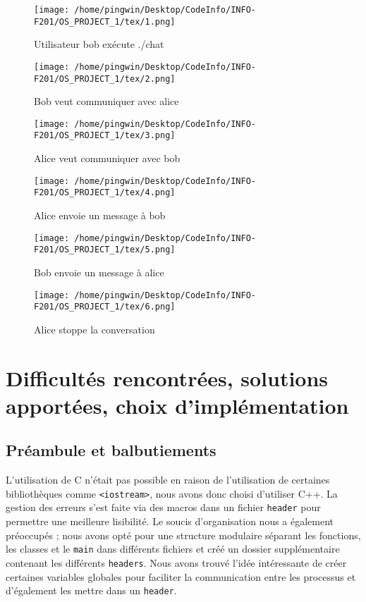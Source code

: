 \documentclass{article}
\begin{document}
\begin{figure}[H]
    \centering
    \texttt{[image: /home/pingwin/Desktop/CodeInfo/INFO-F201/OS\_PROJECT\_1/tex/1.png]}
    \caption{Utilisateur bob exécute ./chat}
    \label{fig:1}
\end{figure}
\begin{figure}[H]
    \centering
    \texttt{[image: /home/pingwin/Desktop/CodeInfo/INFO-F201/OS\_PROJECT\_1/tex/2.png]}
    \caption{Bob veut communiquer avec alice}
    \label{fig:2}
\end{figure}
\begin{figure}[H]
    \centering
    \texttt{[image: /home/pingwin/Desktop/CodeInfo/INFO-F201/OS\_PROJECT\_1/tex/3.png]}
    \caption{Alice veut communiquer avec bob}
    \label{fig:3}
\end{figure}
\begin{figure}[H]
    \centering
    \texttt{[image: /home/pingwin/Desktop/CodeInfo/INFO-F201/OS\_PROJECT\_1/tex/4.png]}
    \caption{Alice envoie un message à bob}
    \label{fig:4}
\end{figure}
\begin{figure}[H]
    \centering
    \texttt{[image: /home/pingwin/Desktop/CodeInfo/INFO-F201/OS\_PROJECT\_1/tex/5.png]}
    \caption{Bob envoie un message à alice}
    \label{fig:5}
\end{figure}
\begin{figure}[H]
    \centering
    \texttt{[image: /home/pingwin/Desktop/CodeInfo/INFO-F201/OS\_PROJECT\_1/tex/6.png]}
    \caption{Alice stoppe la conversation}
    \label{fig:6}
\end{figure}




\section{Difficultés rencontrées, solutions apportées, choix d'implémentation}
\label{difficultes-rencontrees-solutions-apportees-choix-dimplementation}

\subsection{Préambule et balbutiements}
\label{preambule-et-balbutiements}

L'utilisation de C n'était pas possible en raison de l'utilisation de certaines bibliothèques comme \texttt{<iostream>}, nous avons donc choisi d'utiliser C++.
La gestion des erreurs s'est faite via des macros dans un fichier \texttt{header} pour permettre une meilleure lisibilité.
Le soucis d'organisation nous a également préoccupés ; nous avons opté pour une structure modulaire séparant les fonctions, 
les classes et le \texttt{main} dans différents fichiers et créé un dossier supplémentaire contenant les différents \texttt{headers}.
Nous avons trouvé l'idée intéressante de créer certaines variables globales pour faciliter la communication entre les processus et d'également les mettre dans un \texttt{header}.
\end{document}

